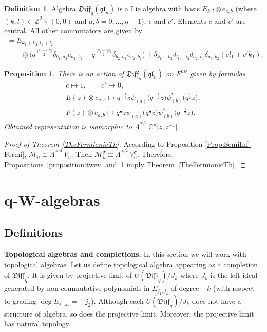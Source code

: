 \documentclass[pdftex]{sigma}
\numberwithin{equation}{section}
\newtheorem{Proposition}[Theorem]{Proposition}
\theoremstyle{definition}
\newtheorem{Definition}[Theorem]{Definition}
\newcommand{\half}{\frac{1}{2}}
\newcommand{\qD}{\mathfrak{Diff}_q}
\newcommand{\psia}{\psi_{({a})}}
\newcommand{\psib}{\psi^*_{( b )}}
\newcommand{\Torgln}{\qD({\mathfrak{gl}_n})}
\newcommand{\siL}{ \Lambda^{^{\! \infty/2}} \,}
\begin{document}
\begin{Definition}
Algebra $\Torgln$ is a Lie algebra with basis $E_{k,l} \otimes e_{a,b}$ (where $(k, l) \in \mathbb{Z}^2 \backslash (0,0)$ and $a,b = 0, \dots, n-1$), $c$ and $c'$. Elements $c$ and $c'$ are central. All other commutators are given by
\begin{gather*}
[ E_{k_1,l_1}\otimes e_{a_1, b_1} , E_{k_2,l_2} \otimes e_{a_2,b_2} ] = E_{k_1+k_2, l_1+l_2} \\
\qquad{} \otimes \big( q^{\frac{l_2 k_1 -l_1 k_2}{2}} \delta_{b_1, a_2} e_{a_1, b_2} -q^{\frac{l_1 k_2-l_2 k_1}{2}} \delta_{b_2, a_1} e_{a_2, b_1} \big) + \delta_{k_1, -k_2} \delta_{l_1, -l_2} \delta_{a_2,b_1} \delta_{a_1, b_2} ( c l_1 + c' k_1 ).
\end{gather*}
\end{Definition}
\begin{Proposition} \label{proposition:toidalGL}
There is an action of $\Torgln$ on $F^{n \psi}$ given by formulas
\begin{gather*}
c \mapsto 1, \qquad c' \mapsto 0, \\
E(z) \otimes e_{a,b} \mapsto q^{-\half} z \psia \big(q^{-\half} z\big) \psib \big(q^{\half} z\big), \\
F(z) \otimes e_{a,b} \mapsto q^{\half} z \psia \big(q^{\half} z\big) \psib \big(q^{{-}\half} z\big).
\end{gather*}
Obtained representation is isomorphic to $\siL \mathbb{C}^n \big[z,z^{-1}\big]$.
\end{Proposition}
\begin{proof}[Proof of Theorem \ref{TheFermionicTh}]
According to Proposition \ref{Prop:SemiInf-Fermi}, $\mathcal{M}_u \cong \siL V_u$. Then $\mathcal{M}_u^{\sigma} \cong \siL V_u^{\sigma}$. Therefore, Propositions~\ref{proposition:twev} and~\ref{proposition:toidalGL} imply Theorem~\ref{TheFermionicTh}.
\end{proof}

\section[$q$-$W$-algebras]{$\boldsymbol{q}$-$\boldsymbol{W}$-algebras} \label{section: q-W}

\subsection{Definitions}
{\bf Topological algebras and completions.} In this section we will work with topological algebras. Let us define topological algebra appearing as a completion of $\qD$. It is given by projective limit of $U(\qD)/J_k$ where $J_k$ is the left ideal generated by non-commutative polynomials in $E_{j_1,j_2}$ of degree $-k$ (with respect to grading $\deg E_{j_1, j_2} = -j_2$). Although each $U(\qD)/J_k$ does not have a structure of algebra, so does the projective limit. Moreover, the projective limit has natural topology.
\end{document}
